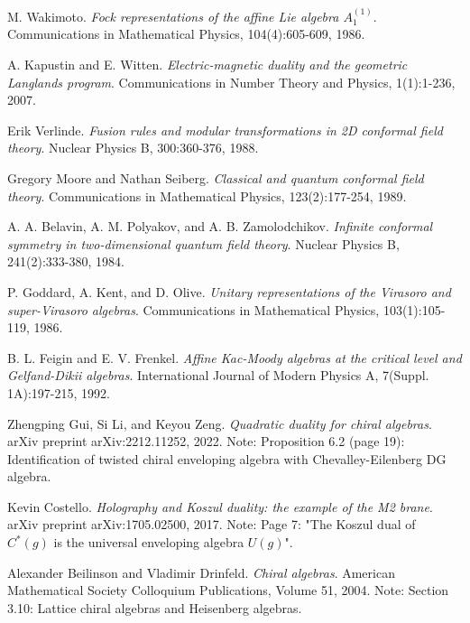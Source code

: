 \begin{thebibliography}{99}
M. Wakimoto.
\textit{Fock representations of the affine Lie algebra $A_1^{(1)}$}.
Communications in Mathematical Physics, 104(4):605-609, 1986.

A. Kapustin and E. Witten.
\textit{Electric-magnetic duality and the geometric Langlands program}.
Communications in Number Theory and Physics, 1(1):1-236, 2007.

Erik Verlinde.
\textit{Fusion rules and modular transformations in 2D conformal field theory}.
Nuclear Physics B, 300:360-376, 1988.

Gregory Moore and Nathan Seiberg.
\textit{Classical and quantum conformal field theory}.
Communications in Mathematical Physics, 123(2):177-254, 1989.

A. A. Belavin, A. M. Polyakov, and A. B. Zamolodchikov.
\textit{Infinite conformal symmetry in two-dimensional quantum field theory}.
Nuclear Physics B, 241(2):333-380, 1984.

P. Goddard, A. Kent, and D. Olive.
\textit{Unitary representations of the Virasoro and super-Virasoro algebras}.
Communications in Mathematical Physics, 103(1):105-119, 1986.

B. L. Feigin and E. V. Frenkel.
\textit{Affine Kac-Moody algebras at the critical level and Gelfand-Dikii algebras}.
International Journal of Modern Physics A, 7(Suppl. 1A):197-215, 1992.

Zhengping Gui, Si Li, and Keyou Zeng.
\textit{Quadratic duality for chiral algebras}.
arXiv preprint arXiv:2212.11252, 2022.
Note: Proposition 6.2 (page 19): Identification of twisted chiral enveloping algebra with Chevalley-Eilenberg DG algebra.

Kevin Costello.
\textit{Holography and Koszul duality: the example of the M2 brane}.
arXiv preprint arXiv:1705.02500, 2017.
Note: Page 7: "The Koszul dual of $C^*(g)$ is the universal enveloping algebra $U(g)$".

Alexander Beilinson and Vladimir Drinfeld.
\textit{Chiral algebras}.
American Mathematical Society Colloquium Publications, Volume 51, 2004.
Note: Section 3.10: Lattice chiral algebras and Heisenberg algebras.
 
\end{thebibliography}